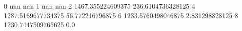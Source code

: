 0 nan nan
1 nan nan
2 1467.355224609375 236.6104736328125
4 1287.5169677734375 56.772216796875
6 1233.5760498046875 2.831298828125
8 1230.7447509765625 0.0
